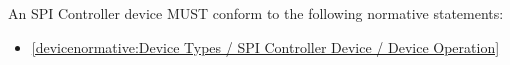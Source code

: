 \label{sec:Conformance / Device Conformance / SPI Controller Device Conformance}

An SPI Controller device MUST conform to the following normative statements:

\begin{itemize}
\item \ref{devicenormative:Device Types / SPI Controller Device / Device Operation}
\end{itemize}
